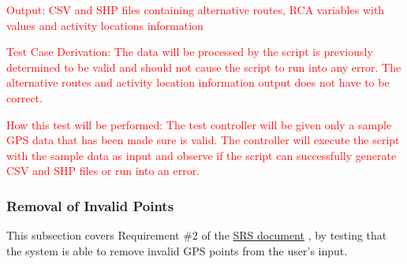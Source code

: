 \documentclass[12pt, titlepage]{article}
\begin{document}
\begin{enumerate}
\textcolor{red}{Output: CSV and SHP files containing alternative routes, RCA variables with values and activity locations information}

\textcolor{red}{Test Case Derivation: The data will be processed by the script is previously determined to be valid and should not cause the script to run into any error. The alternative routes and activity location information output does not have to be correct.}
					
\textcolor{red}{How this test will be performed: The test controller will be given only a sample GPS data that has been made sure is valid. The controller will execute the script with the sample data as input and observe if the script can successfully generate CSV and SHP files or run into an error.}
					
\end{enumerate}

\subsubsection{Removal of Invalid Points}

This subsection covers Requirement \#2 of the \href{https://github.com/paezha/PyERT-BLACK/blob/main/docs/SRS/SRS.pdf}{SRS document} \citep{SRS}, by testing that the system is able to remove invalid GPS points from the user's input. 
\end{document}
